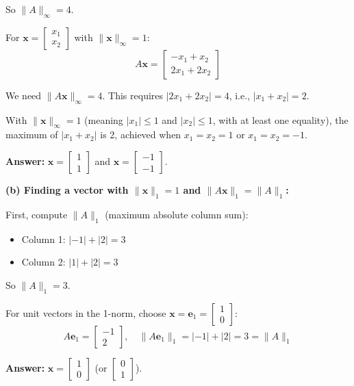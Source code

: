 \documentclass[reqno, answers]{exam}
\begin{document}
\begin{questions}
\begin{solution}
So $\|A\|_\infty = 4$.

For $\mathbf{x} = \begin{bmatrix} x_1 \\ x_2 \end{bmatrix}$ with $\|\mathbf{x}\|_\infty = 1$:
\[
A\mathbf{x} = \begin{bmatrix} -x_1 + x_2 \\ 2x_1 + 2x_2 \end{bmatrix}
\]

We need $\|A\mathbf{x}\|_\infty = 4$. This requires $|2x_1 + 2x_2| = 4$, i.e., $|x_1 + x_2| = 2$.

With $\|\mathbf{x}\|_\infty = 1$ (meaning $|x_1| \leq 1$ and $|x_2| \leq 1$, with at least one equality), the maximum of $|x_1 + x_2|$ is 2, achieved when $x_1 = x_2 = 1$ or $x_1 = x_2 = -1$.

\textbf{Answer:} $\mathbf{x} = \begin{bmatrix} 1 \\ 1 \end{bmatrix}$ and $\mathbf{x} = \begin{bmatrix} -1 \\ -1 \end{bmatrix}$.

\textbf{(b) Finding a vector with $\|\mathbf{x}\|_1 = 1$ and $\|A\mathbf{x}\|_1 = \|A\|_1$:}

First, compute $\|A\|_1$ (maximum absolute column sum):
\begin{itemize}
    \item Column 1: $|-1| + |2| = 3$
    \item Column 2: $|1| + |2| = 3$
\end{itemize}

So $\|A\|_1 = 3$.

For unit vectors in the 1-norm, choose $\mathbf{x} = \mathbf{e}_1 = \begin{bmatrix} 1 \\ 0 \end{bmatrix}$:
\[
A\mathbf{e}_1 = \begin{bmatrix} -1 \\ 2 \end{bmatrix}, \quad \|A\mathbf{e}_1\|_1 = |-1| + |2| = 3 = \|A\|_1
\]

\textbf{Answer:} $\mathbf{x} = \begin{bmatrix} 1 \\ 0 \end{bmatrix}$ (or $\begin{bmatrix} 0 \\ 1 \end{bmatrix}$).


\end{solution}
\end{questions}
\end{document}
